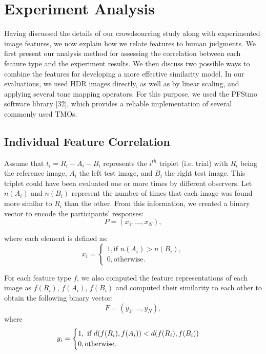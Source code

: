 \chapter{Experiment Analysis}
\label{chp:b4}
Having discussed the details of our crowdsourcing study along with experimented image features, we now explain how we relate features to human judgments. We first present our analysis method for assessing the correlation between each feature type and the experiment results. We then discuss two possible ways to combine the features for developing a more effective similarity model. In our evaluations, we used HDR images directly, as well as by linear scaling, and applying several tone mapping operators. For this purpose, we used the PFStmo software library [32], which provides a reliable implementation of several commonly used TMOs.
\section{Individual Feature Correlation}
Assume that $t_i = R_i-A_i-B_i$ represents the $i^{th}$ triplet (i.e. trial) with $R_i$ being the reference image, $A_i$ the left test image, and $B_i$ the right test image. This triplet could have been evaluated one or more times by different observers. Let $n(A_i)$ and $n(B_i)$ represent the number of times that each image was found more similar to $R_i$ than the other. From this information, we created a binary vector to encode the participants’ responses:
\begin{equation}
\label{eq:p_vector}
P = (x_1, \ldots, x_N),
\end{equation}

where each element is defined as:
\begin{equation}
x_i = \begin{cases}
1, \text{if $n(A_i) > n(B_i)$}, \\
0, \text{otherwise}.
\end{cases}
\end{equation}

For each feature type $f$, we also computed the feature representations of each image as $f(R_i)$, $f(A_i)$, $f(B_i)$ and computed their similarity to each other to obtain the following binary vector:
\begin{equation}
    F = (y_1, . . . , y_N ),
\end{equation}
where
\begin{equation}
y_i = \begin{cases}
1, \text{ if $ d(f(R_i), f(A_i)) < d(f(R_i), f(B_i))$ } \\
0, \text{otherwise}.
\end{cases}
\end{equation}

